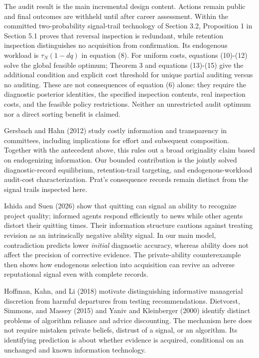 \documentclass[
  11pt,
]{article}
\begin{document}
The audit result is the main incremental design content. Actions remain
public and final outcomes are withheld until after career assessment.
Within the committed two-probability signal-trail technology of Section
3.2, Proposition 1 in Section 5.1 proves that reversal inspection is
redundant, while retention inspection distinguishes no acquisition from
confirmation. Its endogenous workload is \(\tau_N(1-dq)\) in equation
(8). For uniform costs, equations (10)-(12) solve the global feasible
optimum; Theorem 3 and equations (13)-(15) give the additional condition
and explicit cost threshold for unique partial auditing versus no
auditing. These are not consequences of equation (6) alone: they require
the diagnostic posterior identities, the specified inspection contents,
real inspection costs, and the feasible policy restrictions. Neither an
unrestricted audit optimum nor a direct sorting benefit is claimed.

Gersbach and Hahn (2012) study costly information and transparency in
committees, including implications for effort and subsequent
composition. Together with the antecedent above, this rules out a broad
originality claim based on endogenizing information. Our bounded
contribution is the jointly solved diagnostic-record equilibrium,
retention-trail targeting, and endogenous-workload audit-cost
characterization. Prat's consequence records remain distinct from the
signal trails inspected here.

Ishida and Suen (2026) show that quitting can signal an ability to
recognize project quality; informed agents respond efficiently to news
while other agents distort their quitting times. Their information
structure cautions against treating revision as an intrinsically
negative ability signal. In our main model, contradiction predicts lower
\emph{initial} diagnostic accuracy, whereas ability does not affect the
precision of corrective evidence. The private-ability counterexample
then shows how endogenous selection into acquisition can revive an
adverse reputational signal even with complete records.

Hoffman, Kahn, and Li (2018) motivate distinguishing informative
managerial discretion from harmful departures from testing
recommendations. Dietvorst, Simmons, and Massey (2015) and Yaniv and
Kleinberger (2000) identify distinct problems of algorithm reliance and
advice discounting. The mechanism here does not require mistaken private
beliefs, distrust of a signal, or an algorithm. Its identifying
prediction is about whether evidence is acquired, conditional on an
unchanged and known information technology.
\end{document}

